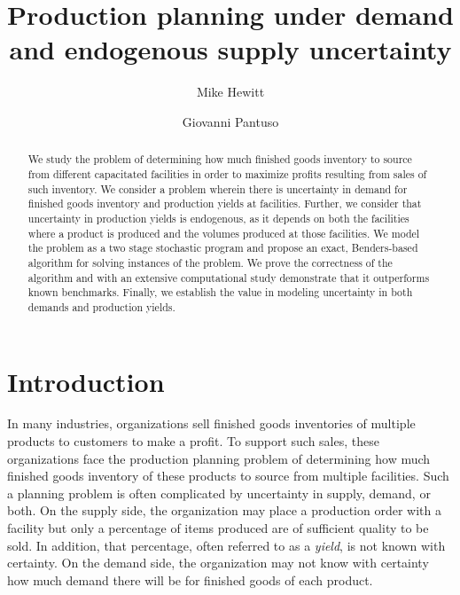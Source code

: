 \documentclass[12pt]{article}
\theoremstyle{thmstylethree}%
\begin{document}
\title{Production planning under demand and endogenous supply uncertainty}



\author[1]{Mike Hewitt}
\author[2]{Giovanni Pantuso}


\date{}


\maketitle

\begin{abstract}
We study the problem of determining how much finished goods inventory to source from different capacitated facilities in order to maximize profits resulting from sales of such inventory. We consider a problem wherein there is uncertainty in demand for finished goods inventory and production yields at facilities. Further, we consider that uncertainty in production yields is endogenous, as it depends on both the facilities where a product is produced and the volumes produced at those facilities. We model the problem as a two stage stochastic program and propose an exact, Benders-based algorithm for solving instances of the problem. We prove the correctness of the algorithm and with an extensive computational study demonstrate that it outperforms known benchmarks. Finally, we establish the value in modeling uncertainty in both demands and production yields.
\end{abstract}

\section{Introduction}\label{sec1}
In many industries, organizations sell finished goods inventories of multiple products to customers to make a profit. To support such sales, these organizations face the production planning problem of determining how much finished goods inventory of these products to source from multiple facilities. Such a planning problem is often complicated by uncertainty in supply, demand, or both. On the supply side, the organization may place a production order with a facility but only a percentage of items produced are of sufficient quality to be sold. In addition, that percentage, often referred to as a \textit{yield}, is not known with certainty. On the demand side, the organization may not know with certainty how much demand there will be for finished goods of each product. 
\end{document}
